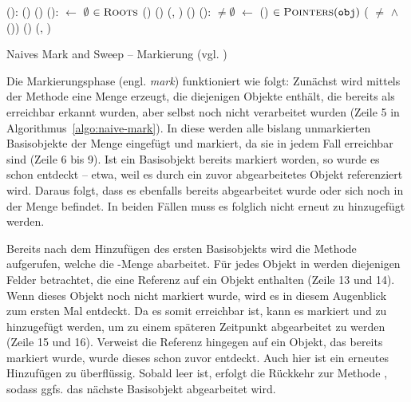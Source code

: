 \begin{algorithm}
\begin{algorithmic}[1]
	\State {}():
	\State \quad {}()
	\State \quad {}()
	\Statex
	\State {}():
	\State \quad {} $\gets$ $\emptyset$				
	\State \quad \FOREACH {} $\in \textsc{Roots}$		
	\State \quad \quad \IF {}()
	\State \quad \quad \quad {}()	
	\State \quad \quad \quad {}(, )	
	\State \quad \quad \quad {}()			
	\Statex
	\State {}():
	\State \quad \WHILE {} $\neq \emptyset$
	\State \quad \quad {} $\gets$ ()			
	\State \quad \quad \FOREACH {} $\in \textsc{Pointers}(\texttt{obj})$	
	\State \quad \quad \quad \IF ( $\neq$ \Null $\wedge$ ())	
	\State \quad \quad \quad \quad {}()	
	\State \quad \quad \quad \quad {}(, )
\end{algorithmic}
\caption[Naives Mark and Sweep -- Markierung]{Naives Mark and Sweep -- Markierung (vgl. \cite[Kap. 2.2]{jones-lins})}
\label{algo:naive-mark}
\end{algorithm}

Die Markierungsphase (engl. \textit{mark}) funktioniert wie folgt:
Zunächst wird mittels der Methode  eine Menge  erzeugt, die diejenigen Objekte enthält, die bereits als erreichbar erkannt wurden, aber selbst noch nicht verarbeitet wurden (Zeile 5 in Algorithmus~\ref{algo:naive-mark}).
In diese werden alle bislang unmarkierten Basisobjekte der Menge \Roots eingefügt und markiert, da sie in jedem Fall erreichbar sind (Zeile 6 bis 9).
Ist ein Basisobjekt bereits markiert worden, so wurde es schon entdeckt -- etwa, weil es durch ein zuvor abgearbeitetes Objekt referenziert wird.
Daraus folgt, dass es ebenfalls bereits abgearbeitet wurde oder sich noch in der Menge  befindet.
In beiden Fällen muss es folglich nicht erneut zu  hinzugefügt werden.

Bereits nach dem Hinzufügen des ersten Basisobjekts wird die Methode  aufgerufen, welche die -Menge abarbeitet.
Für jedes Objekt in  werden diejenigen Felder betrachtet, die eine Referenz auf ein Objekt enthalten (Zeile 13 und 14).
Wenn dieses Objekt noch nicht markiert wurde, wird es in diesem Augenblick zum ersten Mal entdeckt.
Da es somit erreichbar ist, kann es markiert und zu  hinzugefügt werden, um zu einem späteren Zeitpunkt abgearbeitet zu werden (Zeile 15 und 16).
Verweist die Referenz hingegen auf ein Objekt, das bereits markiert wurde, wurde dieses schon zuvor entdeckt.
Auch hier ist ein erneutes Hinzufügen zu  überflüssig.
Sobald  leer ist, erfolgt die Rückkehr zur Methode , sodass ggfs. das nächste Basisobjekt abgearbeitet wird.

